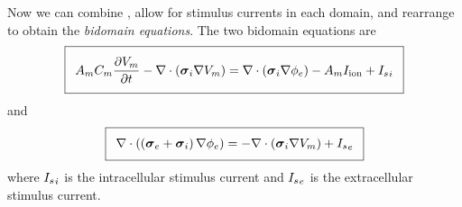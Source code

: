 Now we can combine
,
allow for stimulus currents in each domain, and rearrange to obtain the
\emph{bidomain equations}. The two bidomain equations are
\begin{equation}
  \addtolength{\fboxsep}{5pt}
  \boxed{
    \membraneareavolumeratio\membranecapacitance\delby{\transmembranevoltage}{t}-
    \divergence{}{\pbrac{\tensor{\sigma}_{i}\grad{\transmembranevoltage}}}=
    \divergence{}{\pbrac{\tensor{\sigma}_{i}\grad{\extracellularpotential}}}-
    \membraneareavolumeratio\ioniccurrent+\intracellularstimuluscurrent
  } \label{eqn:BidomainEquation1}
\end{equation}
and
\begin{equation}
  \addtolength{\fboxsep}{5pt}
  \boxed{
    \divergence{}{\pbrac{\pbrac{\tensor{\sigma}_{e}+\tensor{\sigma}_{i}}\grad{\extracellularpotential}}}=
    -\divergence{}{\pbrac{\tensor{\sigma}_{i}\grad{\transmembranevoltage}}}+\extracellularstimuluscurrent
  } \label{eqn:BidomainEquation2}
\end{equation}
where $ { { I }_{s} }_{i} $ is the intracellular stimulus
current and $ { { I }_{s} }_{e} $ is the extracellular
stimulus current.
